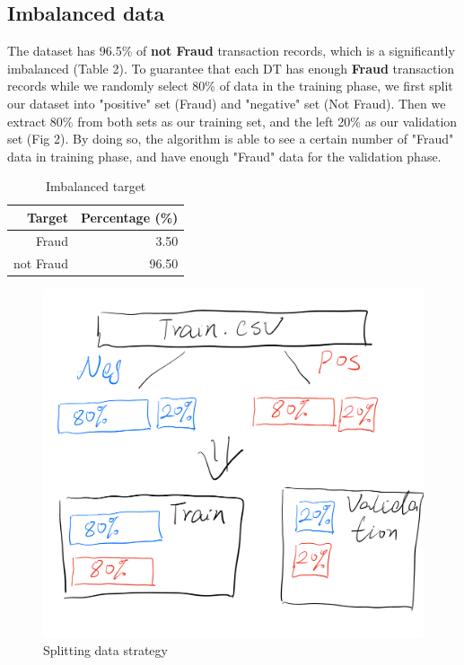 \documentclass{article}
\begin{document}
\subsection{Imbalanced data}
The dataset has 96.5\% of \textbf{not Fraud} transaction records, which is a significantly imbalanced (Table 2). To guarantee that each DT has enough \textbf{Fraud} transaction records while we randomly select 80\% of data in the training phase, we first split our dataset into "positive" set (Fraud) and "negative" set (Not Fraud). Then we extract 80\% from both sets as our training set, and the left 20\% as our validation set (Fig 2). By doing so, the algorithm is able to see a certain number of "Fraud" data in training phase, and have enough "Fraud" data for the validation phase.
\begin{table}[H]
    \centering        
    \begin{tabular}{r|r}
        Target & Percentage (\%)\\\hline
        Fraud& 3.50\\
        not Fraud& 96.50\\
    \end{tabular}
    \caption{\label{tab:2} Imbalanced target}
\end{table}
\begin{figure}[H]
  \centering
  \includegraphics[width=1\linewidth]{Fig/Imblanced_data.jpeg}
  \caption{\label{fig:2}Splitting data strategy}
\end{figure}
\end{document}
